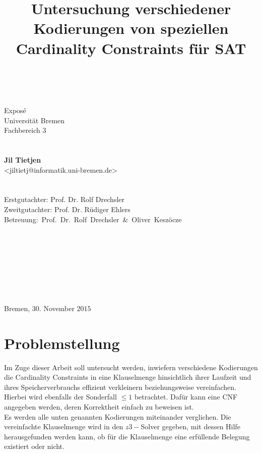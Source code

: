 \documentclass[a4,abstract=on]{scrartcl}
\title{Untersuchung verschiedener Kodierungen von speziellen Cardinality Constraints für SAT}
\date{~}
\begin{document}
	\maketitle
\thispagestyle{empty}
\begin{center}
\begin{Large}
Exposé\\Universität Bremen\\Fachbereich $3$\\
~\\~\\
\textbf{Jil Tietjen}\\<jiltietj@informatik.uni-bremen.de>\\
~\\~\\
Erstgutachter: Prof. Dr. Rolf Drechsler\\
Zweitgutachter: Prof. Dr. Rüdiger Ehlers\\
\mbox{Betreuung: Prof. Dr. Rolf Drechsler \&~Oliver Keszöcze}\\~\\~\\~\\~\\~\\~\\~\\~\\
Bremen, $30$. November $2015$
\end{Large}
\end{center}



	\tableofcontents
	\clearpage

\section{Problemstellung}
Im Zuge dieser Arbeit soll untersucht werden, inwiefern verschiedene Kodierungen die Cardinality Constraints in eine Klauselmenge hinsichtlich ihrer Laufzeit und ihres Speicherverbrauchs effizient verkleinern beziehungsweise vereinfachen. Hierbei wird ebenfalls der Sonderfall $\leq 1$ betrachtet. Dafür kann eine CNF angegeben werden, deren Korrektheit einfach zu beweisen ist. \\
Es werden alle unten genannten Kodierungen miteinander verglichen. Die vereinfachte Klauselmenge wird in den $z3-$Solver gegeben, mit dessen Hilfe herausgefunden werden kann, ob für die Klauselmenge eine erfüllende Belegung existiert oder nicht.\\
\end{document}
